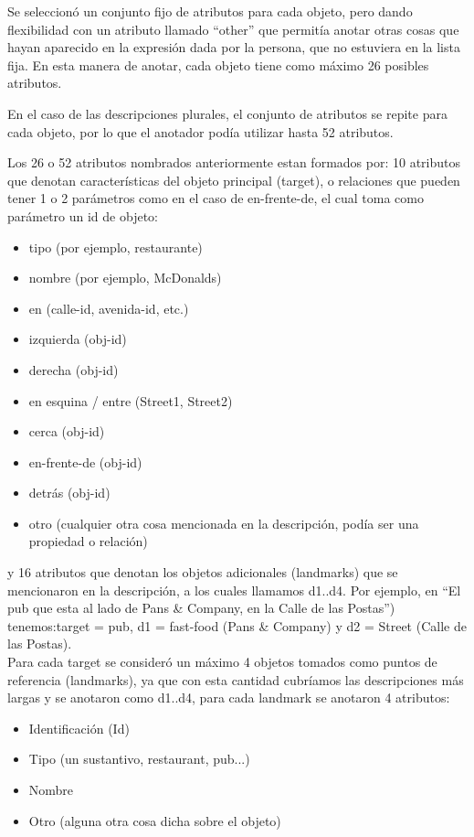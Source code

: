 
Se seleccion\'o un conjunto fijo de atributos para cada objeto, pero dando flexibilidad con un atributo llamado ``other'' que permit\'ia anotar otras cosas que hayan aparecido en la expresi\'on dada por la persona, que no estuviera en la lista fija. En esta manera de anotar, cada objeto tiene como m\'aximo 26 posibles atributos.

En el caso de las descripciones plurales, el conjunto de atributos se repite para cada objeto, por lo que el anotador pod\'{i}a utilizar hasta 52 atributos.

Los 26 o 52 atributos nombrados anteriormente estan formados por:
10 atributos que denotan caracter\'isticas del objeto principal (target), o relaciones que pueden tener 1 o 2 par\'ametros como en el caso de en-frente-de, el cual toma como par\'ametro un id de objeto:
\begin{itemize}
  \item tipo (por ejemplo, restaurante)
  \item nombre (por ejemplo, McDonalds)
  \item en (calle-id, avenida-id, etc.)
  \item izquierda (obj-id)
  \item derecha (obj-id)
  \item en esquina / entre (Street1, Street2)
  \item cerca (obj-id)
  \item en-frente-de (obj-id)
  \item detr\'as (obj-id)
  \item otro (cualquier otra cosa mencionada en la descripci\'on, pod\'ia ser una propiedad o relaci\'on)
\end{itemize}
y 16 atributos que denotan los objetos adicionales (landmarks) que se mencionaron en la descripci\'on, a los cuales llamamos d1..d4. Por ejemplo, en ``El pub que esta al lado de Pans \& Company, en la Calle de las Postas'') tenemos:target = pub, d1 = fast-food (Pans \& Company) y d2 = Street (Calle de las Postas).\\

Para cada target se consider\'o un m\'aximo 4 objetos tomados como puntos de referencia (landmarks), ya que con esta cantidad cubr\'iamos las descripciones m\'as largas y se anotaron como d1..d4, para cada landmark se anotaron 4 atributos:
\begin{itemize}
  \item Identificaci\'on (Id)
  \item Tipo (un sustantivo, restaurant, pub...)
  \item Nombre
  \item Otro (alguna otra cosa dicha sobre el objeto)
\end{itemize}

